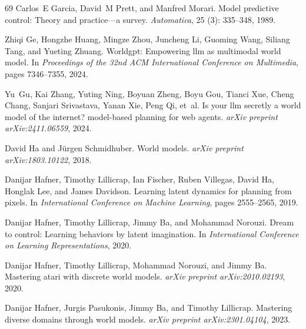 \begin{thebibliography}{69}
Carlos~E Garcia, David~M Prett, and Manfred Morari.
\newblock Model predictive control: Theory and practice—a survey.
\newblock \emph{Automatica}, 25 (3): 335--348, 1989.

Zhiqi Ge, Hongzhe Huang, Mingze Zhou, Juncheng Li, Guoming Wang, Siliang Tang, and Yueting Zhuang.
\newblock Worldgpt: Empowering llm as multimodal world model.
\newblock In \emph{Proceedings of the 32nd ACM International Conference on Multimedia}, pages 7346--7355, 2024.

Yu~Gu, Kai Zhang, Yuting Ning, Boyuan Zheng, Boyu Gou, Tianci Xue, Cheng Chang, Sanjari Srivastava, Yanan Xie, Peng Qi, et~al.
\newblock Is your llm secretly a world model of the internet? model-based planning for web agents.
\newblock \emph{arXiv preprint arXiv:2411.06559}, 2024.

David Ha and J{\"u}rgen Schmidhuber.
\newblock World models.
\newblock \emph{arXiv preprint arXiv:1803.10122}, 2018.

Danijar Hafner, Timothy Lillicrap, Ian Fischer, Ruben Villegas, David Ha, Honglak Lee, and James Davidson.
\newblock Learning latent dynamics for planning from pixels.
\newblock In \emph{International Conference on Machine Learning}, pages 2555--2565, 2019.

Danijar Hafner, Timothy Lillicrap, Jimmy Ba, and Mohammad Norouzi.
\newblock Dream to control: Learning behaviors by latent imagination.
\newblock In \emph{International Conference on Learning Representations}, 2020{}.

Danijar Hafner, Timothy Lillicrap, Mohammad Norouzi, and Jimmy Ba.
\newblock Mastering atari with discrete world models.
\newblock \emph{arXiv preprint arXiv:2010.02193}, 2020{}.

Danijar Hafner, Jurgis Pasukonis, Jimmy Ba, and Timothy Lillicrap.
\newblock Mastering diverse domains through world models.
\newblock \emph{arXiv preprint arXiv:2301.04104}, 2023.


\end{thebibliography}
